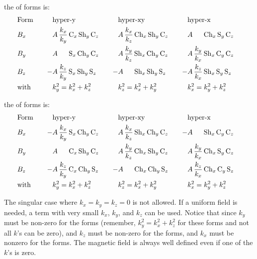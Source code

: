 the   of forms is:
\begin{alignat}{7}
  & \text{Form} \quad  && \text{hyper-y} \quad && \text{hyper-xy} \quad && \text{hyper-x} \quad \CRNO
  & B_x  
    & & A \, \dfrac{k_x}{k_y} \, \Ce_x \, \Sh_y \, \Ce_z \quad
    & & A \, \dfrac{k_x}{k_z} \, \Ch_x \, \Sh_y \, \Ce_z \quad
    & & A \, \hphphp          \, \Ch_x \, \Se_y \, \Ce_z \quad \CRNO
  & B_y
    & & A \, \hphphp          \, \Se_x \, \Ch_y \, \Ce_z \quad
    & & A \, \dfrac{k_y}{k_z} \, \Sh_x \, \Ch_y \, \Ce_z \quad
    & & A \, \dfrac{k_y}{k_x} \, \Sh_x \, \Ce_y \, \Ce_z \quad \\
  & B_z
    &-& A \, \dfrac{k_z}{k_y} \, \Se_x \, \Sh_y \, \Se_z \quad
    &-& A \, \hphphp          \, \Sh_x \, \Sh_y \, \Se_z \quad
    &-& A \, \dfrac{k_z}{k_x} \, \Sh_x \, \Se_y \, \Se_z \quad \CRNO
  & \text{with} 
    && k_y^2 = k_x^2 + k_z^2 
    && k_z^2 = k_x^2 + k_y^2
    && k_x^2 = k_y^2 + k_z^2 \nonumber
\end{alignat}

the   of forms is:
\begin{alignat}{7}
  & \text{Form} \quad  && \text{hyper-y} \quad && \text{hyper-xy} \quad && \text{hyper-x} \quad \CRNO
  & B_x  
    &-& A \, \dfrac{k_x}{k_y} \, \Se_x \, \Ch_y \, \Ce_z \quad
    & & A \, \dfrac{k_x}{k_z} \, \Sh_x \, \Ch_y \, \Ce_z \quad
    &-& A \, \hphphp          \, \Sh_x \, \Ce_y \, \Ce_z \quad \CRNO
  & B_y
    & & A \, \hphphp          \, \Ce_x \, \Sh_y \, \Ce_z \quad
    & & A \, \dfrac{k_y}{k_z} \, \Ch_x \, \Sh_y \, \Ce_z \quad
    & & A \, \dfrac{k_y}{k_x} \, \Ch_x \, \Se_y \, \Ce_z \quad \label{bsq} \\
  & B_z
    &-& A \, \dfrac{k_z}{k_y} \, \Ce_x \, \Ch_y \, \Se_z \quad
    &-& A \, \hphphp          \, \Ch_x \, \Ch_y \, \Se_z \quad
    & & A \, \dfrac{k_z}{k_x} \, \Ch_x \, \Ce_y \, \Se_z \quad \CRNO
  & \text{with} 
    && k_y^2 = k_x^2 + k_z^2 
    && k_z^2 = k_x^2 + k_y^2
    && k_x^2 = k_y^2 + k_z^2 \nonumber
\end{alignat}


The singular case where $k_x = k_y = k_z = 0$ is not allowed. If a
uniform field is needed, a term with very small $k_x$, $k_y$, and
$k_z$ can be used. Notice that since $k_y$ must be non-zero for the
 forms (remember, $k_y^2 = k_x^2 + k_z^2$ for these forms
and not all $k$'s can be zero), and $k_z$ must be non-zero for the
 forms, and $k_x$ must be nonzero for the 
forms. The magnetic field is always well defined even if one of the
$k$'s is zero.

